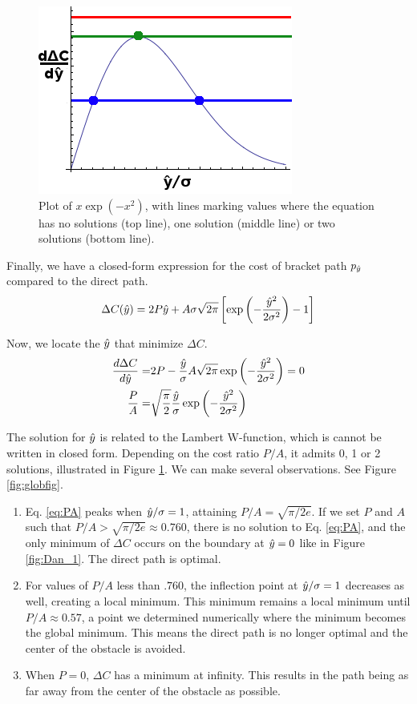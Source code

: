 \begin{figure}[b]
\centering
\includegraphics[width=0.4\columnwidth]{graphix/lambert.png}
\caption{Plot of $x \exp(-x^2)$, with lines marking values where the equation has no solutions (top line), one solution (middle line) or two solutions (bottom line).}
\label{fig:lambert}
\end{figure}

Finally, we have a closed-form expression for the cost of bracket path $p_{\hat{y}}$ compared to the direct path.
\begin{equation}
\Delta C(\hat{y}) = 2P\hat{y} + A\sigma\sqrt{2\pi}\left[\exp\left(-\frac{\hat{y}^2}{2\sigma^2}\right) - 1\right]
\end{equation}

Now, we locate the $\hat{y}$ that minimize $\Delta C$.
\begin{align}
\frac{d\Delta C}{d\yhat} = 
&2P - \frac{\yhat}{\sigma}A\sqrt{2\pi} \exp\left(-\frac{\yhat^2}{2\sigma^2} \right) = 0 \\
  \frac{P}{A} =& \sqrt{\frac{\pi}{2}} \frac{\yhat}{\sigma} \exp\left(-\frac{\yhat^2}{2\sigma^2} \right)
  \label{eq:PA}
\end{align}


The solution for $\hat{y}$ is related to the Lambert W-function, which is cannot be written in closed form.  Depending on the cost ratio $P/A$, it admits 0, 1 or 2 solutions, illustrated in Figure \ref{fig:lambert}. We can make several observations. See Figure \ref{fig:globfig}.
\begin{enumerate}
\item Eq. \ref{eq:PA} peaks when $\hat{y}/\sigma = 1$, attaining $P/A=\sqrt{\pi/2e}$. If we set $P$ and $A$ such that $P/A > \sqrt{\pi/2e} \approx 0.760$, there is no solution to Eq. \ref{eq:PA}, and the only minimum of $\Delta C$ occurs on the boundary at $\hat{y}=0$ like in Figure \ref{fig:Dan_1}. The direct path is optimal. 
\item For values of $P/A$ less than $.760$, the inflection point at $\hat{y}/\sigma=1$ decreases as well, creating a local minimum. This minimum remains a local minimum until $P/A \approx 0.57$, a point we determined numerically where the minimum becomes the global minimum. This means the direct path is no longer optimal and the center of the obstacle is avoided. 
\item When $P=0$, $\Delta C$ has a minimum at infinity. This results in the path being as far away from the center of the obstacle as possible. 
\end{enumerate}

